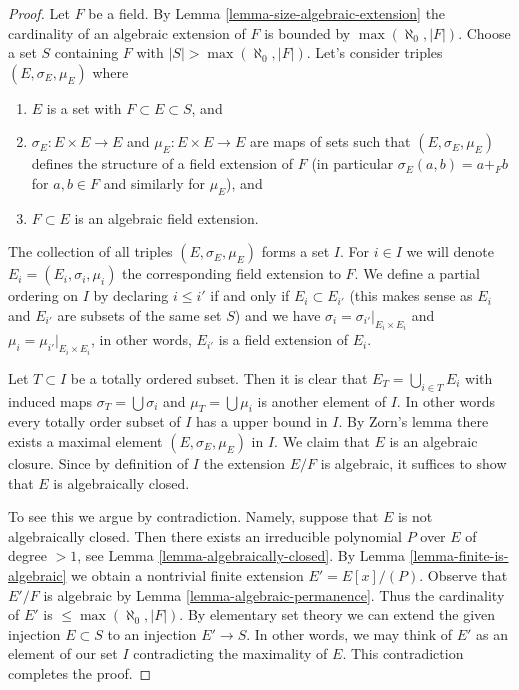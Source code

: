 \begin{proof}
Let $F$ be a field. By Lemma \ref{lemma-size-algebraic-extension} the
cardinality of an algebraic extension of $F$ is bounded by
$\max(\aleph_0, |F|)$. Choose a set $S$ containing $F$ with
$|S| > \max(\aleph_0, |F|)$. Let's consider triples
$(E, \sigma_E, \mu_E)$ where
\begin{enumerate}
\item $E$ is a set with $F \subset E \subset S$, and
\item $\sigma_E : E \times E \to E$ and $\mu_E : E \times E \to E$
are maps of sets such that $(E, \sigma_E, \mu_E)$ defines the structure
of a field extension of $F$ (in particular $\sigma_E(a, b) = a +_F b$
for $a, b \in F$ and similarly for $\mu_E$), and
\item $F \subset E$ is an algebraic field extension.
\end{enumerate}
The collection of all triples $(E, \sigma_E, \mu_E)$ forms a set $I$.
For $i \in I$ we will denote $E_i = (E_i, \sigma_i, \mu_i)$ the
corresponding field extension to $F$. We define a partial ordering on
$I$ by declaring $i \leq i'$ if and only if $E_i \subset E_{i'}$
(this makes sense as $E_i$ and $E_{i'}$ are subsets of the same set $S$)
and we have $\sigma_i = \sigma_{i'}|_{E_i \times E_i}$ and
$\mu_i = \mu_{i'}|_{E_i \times E_i}$, in other words, $E_{i'}$ is a field
extension of $E_i$.

\medskip\noindent
Let $T \subset I$ be a totally ordered subset. Then it is clear that
$E_T = \bigcup_{i \in T} E_i$ with induced maps $\sigma_T = \bigcup \sigma_i$
and $\mu_T = \bigcup \mu_i$ is another element of $I$. In other words
every totally order subset of $I$ has a upper bound in $I$. By Zorn's lemma
there exists a maximal element $(E, \sigma_E, \mu_E)$ in $I$. We claim that
$E$ is an algebraic closure. Since by definition of $I$ the extension
$E/F$ is algebraic, it suffices to show that $E$ is algebraically closed.

\medskip\noindent
To see this we argue by contradiction. Namely, suppose that $E$ is not
algebraically closed. Then there exists an irreducible polynomial
$P$ over $E$ of degree $> 1$, see Lemma \ref{lemma-algebraically-closed}.
By Lemma \ref{lemma-finite-is-algebraic} we obtain a nontrivial finite
extension $E' = E[x]/(P)$. Observe that $E'/F$ is algebraic by
Lemma \ref{lemma-algebraic-permanence}.
Thus the cardinality of $E'$ is $\leq \max(\aleph_0, |F|)$.
By elementary set theory we can extend the given injection
$E \subset S$ to an injection $E' \to S$. In other words, we may
think of $E'$ as an element of our set $I$ contradicting the
maximality of $E$. This contradiction completes the proof.
\end{proof}

